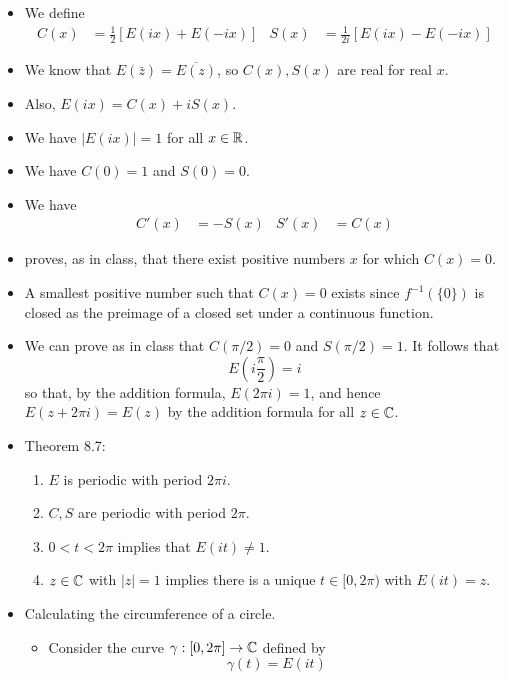 \documentclass[../notes.tex]{subfiles}
\begin{document}
\begin{itemize}
    \item We define
    \begin{align*}
        C(x) &= \frac{1}{2}[E(ix)+E(-ix)]&
        S(x) &= \frac{1}{2i}[E(ix)-E(-ix)]
    \end{align*}
    \item We know that $E(\bar{z})=\overline{E(z)}$, so $C(x),S(x)$ are real for real $x$.
    \item Also, $E(ix)=C(x)+iS(x)$.
    \item We have $|E(ix)|=1$ for all $x\in\mathbb{R}$.
    \item We have $C(0)=1$ and $S(0)=0$.
    \item We have
    \begin{align*}
        C'(x) &= -S(x)&
        S'(x) &= C(x)
    \end{align*}
    \item \textcite{bib:Rudin} proves, as in class, that there exist positive numbers $x$ for which $C(x)=0$.
    \item A smallest positive number such that $C(x)=0$ exists since $f^{-1}(\{0\})$ is closed as the preimage of a closed set under a continuous function.
    \item We can prove as in class that $C(\pi/2)=0$ and $S(\pi/2)=1$. It follows that
    \begin{equation*}
        E(i\frac{\pi}{2}) = i
    \end{equation*}
    so that, by the addition formula, $E(2\pi i)=1$, and hence $E(z+2\pi i)=E(z)$ by the addition formula for all $z\in\mathbb{C}$.
    \item Theorem 8.7:
    \begin{enumerate}[label={(\alph*)}]
        \item $E$ is periodic with period $2\pi i$.
        \item $C,S$ are periodic with period $2\pi$.
        \item $0<t<2\pi$ implies that $E(it)\neq 1$.
        \item $z\in\mathbb{C}$ with $|z|=1$ implies there is a unique $t\in[0,2\pi)$ with $E(it)=z$.
    \end{enumerate}
    \item Calculating the circumference of a circle.
    \begin{itemize}
        \item Consider the curve $\gamma:[0,2\pi]\to\mathbb{C}$ defined by
        \begin{equation*}
            \gamma(t) = E(it)
        \end{equation*}

\end{itemize}
\end{itemize}
\end{document}
